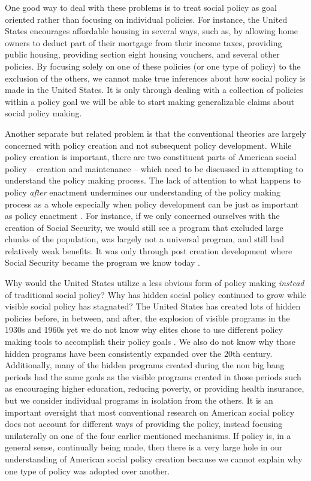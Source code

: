 \documentclass[12pt]{article}
\begin{document}
One good way to deal with these problems is to treat social policy as goal oriented rather than focusing on individual policies. For instance, the United States encourages affordable housing in several ways, such as, by allowing home owners to deduct part of their mortgage from their income taxes, providing public housing, providing section eight housing vouchers, and several other policies. By focusing solely on one of these policies (or one type of policy) to the exclusion of the others, we cannot make true inferences about how social policy is made in the United States. It is only through dealing with a collection of policies within a policy goal we will be able to start making generalizable claims about social policy making.

Another separate but related problem is that the conventional theories are largely concerned with policy creation and not subsequent policy development. While policy creation is important, there are two constituent parts of American social policy -- creation and maintenance -- which need to be discussed in attempting to understand the policy making process. The lack of attention to what happens to policy \emph{after} enactment undermines our understanding of the policy making process as a whole especially when policy development can be just as important as policy enactment \citep{patashnik2008}. For instance, if we only concerned ourselves with the creation of Social Security, we would still see a program that excluded large chunks of the population, was largely not a universal program, and still had relatively weak benefits. It was only through post creation development where Social Security became the program we know today \citep{derthick1979}. 


Why would the United States utilize a less obvious form of policy making \emph{instead} of traditional social policy? Why has hidden social policy continued to grow while visible social policy has stagnated? The United States has created lots of hidden policies before, in between, and after, the explosion of visible programs in the 1930s and 1960s yet we do not know why elites chose to use different policy making tools to accomplish their policy goals \citep[Ch. 2]{howard2008}. We also do not know why those hidden programs have been consistently expanded over the 20th century. Additionally, many of the hidden programs created during the non big bang periods had the same goals as the visible programs created in those periods such as encouraging higher education, reducing poverty, or providing health insurance, but we consider individual programs in isolation from the others. It is an important oversight that most conventional research on American social policy does not account for different ways of providing the policy, instead focusing unilaterally on one of the four earlier mentioned mechanisms. If policy is, in a general sense, continually being made, then there is a very large hole in our understanding of American social policy creation because we cannot explain why one type of policy was adopted over another.
\end{document}
